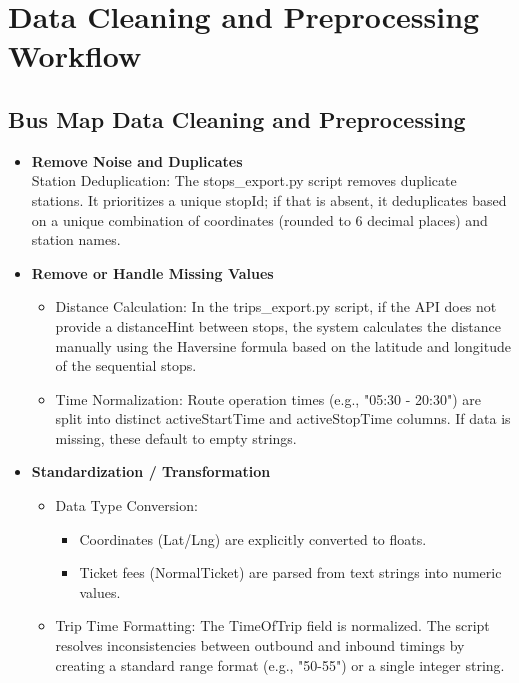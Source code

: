 
\usetikzlibrary{shapes.geometric, arrows.meta, positioning, calc, shadows}
\chapter{Data Cleaning and Preprocessing Workflow}


\section{Bus Map Data Cleaning and Preprocessing}
\begin{itemize}
\item \textbf{Remove Noise and Duplicates} \\
Station Deduplication: The stops\_export.py script removes duplicate stations. It prioritizes a unique stopId; if that is absent, it deduplicates based on a unique combination of coordinates (rounded to 6 decimal places) and station names.
\item \textbf{Remove or Handle Missing Values}
\begin{itemize}
\item Distance Calculation: In the trips\_export.py script, if the API does not provide a distanceHint between stops, the system calculates the distance manually using the Haversine formula based on the latitude and longitude of the sequential stops.
\item Time Normalization: Route operation times (e.g., "05:30 - 20:30") are split into distinct activeStartTime and activeStopTime columns. If data is missing, these default to empty strings.
\end{itemize}
\item \textbf{Standardization / Transformation}
\begin{itemize}
\item Data Type Conversion:
\begin{itemize}
\item Coordinates (Lat/Lng) are explicitly converted to floats.
\item Ticket fees (NormalTicket) are parsed from text strings into numeric values.
\end{itemize}
\item Trip Time Formatting: The TimeOfTrip field is normalized. The script resolves inconsistencies between outbound and inbound timings by creating a standard range format (e.g., "50-55") or a single integer string.
\end{itemize}
\end{itemize}




